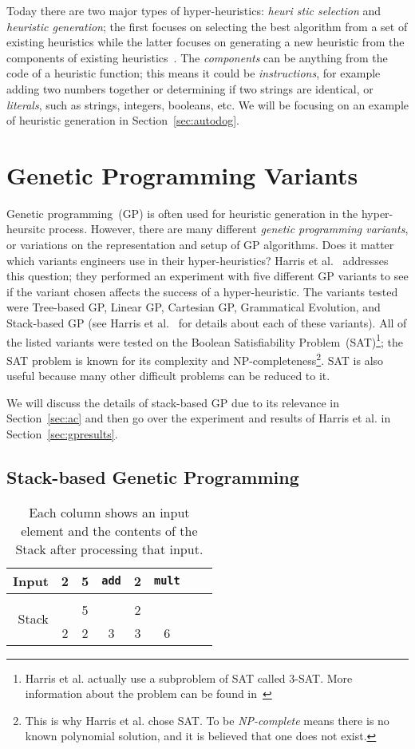 \documentclass{sig-alternate}
\begin{document}
Today there are two major types of hyper-heuristics: \textit{heuri\- stic selection} and \textit{heuristic generation}; the first focuses on selecting the best algorithm from a set of existing heuristics while the latter focuses on generating a new heuristic from the components of existing heuristics~\cite{pappa:2014}. The \textit{components} can be anything from the code of a heuristic function; this means it could be \textit{instructions}, for example adding two numbers together or determining if two strings are identical, or \textit{literals}, such as strings, integers, booleans, etc. We will be focusing on an example of heuristic generation in Section~\ref{sec:autodog}.

\section{Genetic Programming Variants}
\label{sec:gpvariants}
Genetic programming~(GP) is often used for heuristic generation in the hyper-heursitc process. However, there are many different \textit{genetic programming variants}, or variations on the representation and setup of GP algorithms. Does it matter which variants engineers use in their hyper-heuristics? Harris et al.~\cite{harris:2015} addresses this question; they performed an experiment with five different GP variants to see if the variant chosen affects the success of a hyper-heuristic. The variants tested were Tree-based GP, Linear GP, Cartesian GP, Grammatical Evolution, and Stack-based GP (see Harris et al.~\cite{harris:2015} for details about each of these variants). All of the listed variants were tested on the Boolean Satisfiability Problem~(SAT)\footnote{Harris et al. actually use a subproblem of SAT called 3-SAT. More information about the problem can be found in~\cite{harris:2015}}; the SAT problem is known for its complexity and NP-compl\-eteness\footnote{This is why Harris et al. chose SAT. To be \textit{NP-complete} means there is no known polynomial solution, and it is believed that one does not exist.}. SAT is also useful because many other difficult problems can be reduced to it. 

We will discuss the details of stack-based GP due to its relevance in Section~\ref{sec:ac} and then go over the experiment and results of Harris et al. in Section~\ref{sec:gpresults}.

\subsection{Stack-based Genetic Programming}
\label{sec:sgp}
\begin{table}
	\centering
	\begin{tabular}{|r|c|c|c|c|c|c|c|}
		\hline
		Input & 2 & 5 & \texttt{add} & 2 & \texttt{mult} \\
		\hline
		\multirow{3}{*}{Stack} & & & & &\\
		&   & 5 &   & 2 &   \\
		& 2 & 2 & 3 & 3 & 6 \\
		\hline
	\end{tabular}
	\caption{Each column shows an input element and the contents of the Stack after processing that input.}
	\label{tab:stacks}
\end{table}
\end{document}
